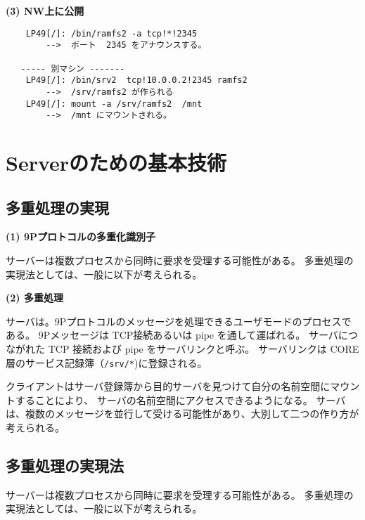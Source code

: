 {\vspace{4cm}

{\bf\flushleft  (3) NW上に公開}

\begin{verbatim}
    LP49[/]: /bin/ramfs2 -a tcp!*!2345 
        -->  ポート  2345 をアナウンスする。

   ----- 別マシン -------　　
    LP49[/]: /bin/srv2  tcp!10.0.0.2!2345 ramfs2
        -->  /srv/ramfs2 が作られる
    LP49[/]: mount -a /srv/ramfs2  /mnt
        -->  /mnt にマウントされる。
\end{verbatim}

\vspace{4cm}



\chapter{Serverのための基本技術 }

\section{多重処理の実現}

{\bf\flushleft (1) 9Pプロトコルの多重化識別子}

  サーバーは複数プロセスから同時に要求を受理する可能性がある。
多重処理の実現法としては、一般に以下が考えられる。
   
\vspace{4cm}


{\bf\flushleft (2) 多重処理}

      サーバは。9Pプロトコルのメッセージを処理できるユーザモードのプロセスである。
      9Pメッセージは TCP接続あるいは pipe を通して運ばれる。
      サーバにつながれた TCP 接続および pipe をサーバリンクと呼ぶ。
      サーバリンクは CORE層のサービス記録簿（{\tt /srv/*})に登録される。

      クライアントはサーバ登録簿から目的サーバを見つけて自分の名前空間にマウントすることにより、
      サーバの名前空間にアクセスできるようになる。
      サーバは、複数のメッセージを並行して受ける可能性があり、大別して二つの作り方が考えられる。





\section{多重処理の実現法}

      サーバーは複数プロセスから同時に要求を受理する可能性がある。
多重処理の実現法としては、一般に以下が考えられる。

}
